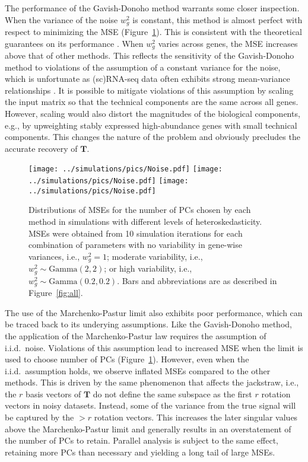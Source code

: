 \documentclass[10pt,letterpaper]{article}
\begin{document}
The performance of the Gavish-Donoho method warrants some closer inspection.
When the variance of the noise $w^2_g$ is constant, this method is almost perfect with respect to minimizing the MSE (Figure~\ref{fig:noise}).
This is consistent with the theoretical guarantees on its performance \cite{gavish2014optimal}.
When $w^2_g$ varies across genes, the MSE increases above that of other methods.
This reflects the sensitivity of the Gavish-Donoho method to violations of the assumption of a constant variance for the noise,
which is unfortunate as (sc)RNA-seq data often exhibits strong mean-variance relationships \cite{lun2016stepbystep,law2014voom}. 
It is possible to mitigate violations of this assumption by scaling the input matrix so that the technical components are the same across all genes.
However, scaling would also distort the magnitudes of the biological components, e.g., by upweighting stably expressed high-abundance genes with small technical components.
This changes the nature of the problem and obviously precludes the accurate recovery of $\mathbf{T}$.

\begin{figure}
\begin{center}
    \texttt{[image: ../simulations/pics/Noise.pdf]}
    \texttt{[image: ../simulations/pics/Noise.pdf]}
    \texttt{[image: ../simulations/pics/Noise.pdf]}
\end{center}
\caption{Distributions of MSEs for the number of PCs chosen by each method in simulations with different levels of heteroskedasticity.
MSEs were obtained from 10 simulation iterations for each combination of parameters with 
no variability in gene-wise variances, i.e., $w_g^2=1$;
moderate variability, i.e., $w_g^2 \sim \mbox{Gamma}(2, 2)$;
or high variability, i.e., $w_g^2 \sim \mbox{Gamma}(0.2, 0.2)$.
Bars and abbreviations are as described in Figure~\ref{fig:all}.    
}
\label{fig:noise}
\end{figure}

The use of the Marchenko-Pastur limit also exhibits poor performance, which can be traced back to its underying assumptions.
Like the Gavish-Donoho method, the application of the Marchenko-Pastur law requires the assumption of i.i.d.\ noise.
Violations of this assumption lead to increased MSE when the limit is used to choose number of PCs (Figure~\ref{fig:noise}).
However, even when the i.i.d.\ assumption holds, we observe inflated MSEs compared to the other methods.
This is driven by the same phenomenon that affects the jackstraw, 
i.e., the $r$ basis vectors of $\mathbf{T}$ do not define the same subspace as the first $r$ rotation vectors in noisy datasets.
Instead, some of the variance from the true signal will be captured by the $>r$ rotation vectors.
This increases the later singular values above the Marchenko-Pastur limit and generally results in an overstatement of the number of PCs to retain. 
Parallel analysis is subject to the same effect, retaining more PCs than necessary and yielding a long tail of large MSEs.
\end{document}
